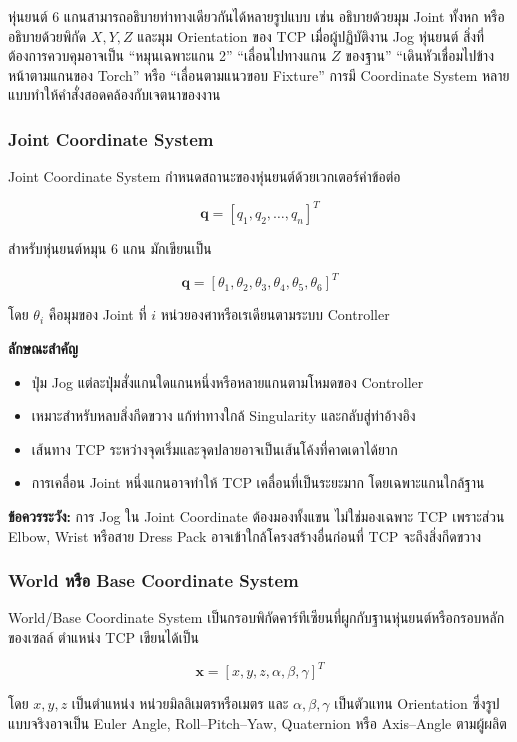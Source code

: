 หุ่นยนต์ 6 แกนสามารถอธิบายท่าทางเดียวกันได้หลายรูปแบบ เช่น อธิบายด้วยมุม Joint ทั้งหก หรืออธิบายด้วยพิกัด $X,Y,Z$ และมุม Orientation ของ TCP เมื่อผู้ปฏิบัติงาน Jog หุ่นยนต์ สิ่งที่ต้องการควบคุมอาจเป็น “หมุนเฉพาะแกน 2” “เลื่อนไปทางแกน $Z$ ของฐาน” “เดินหัวเชื่อมไปข้างหน้าตามแกนของ Torch” หรือ “เลื่อนตามแนวขอบ Fixture” การมี Coordinate System หลายแบบทำให้คำสั่งสอดคล้องกับเจตนาของงาน

\subsubsection{Joint Coordinate System}

Joint Coordinate System กำหนดสถานะของหุ่นยนต์ด้วยเวกเตอร์ค่าข้อต่อ

\[
\mathbf{q} = [q_1,q_2,\ldots,q_n]^T
\]

สำหรับหุ่นยนต์หมุน 6 แกน มักเขียนเป็น

\[
\mathbf{q} = [\theta_1,\theta_2,\theta_3,\theta_4,\theta_5,\theta_6]^T
\]

โดย $\theta_i$ คือมุมของ Joint ที่ $i$ หน่วยองศาหรือเรเดียนตามระบบ Controller

\textbf{ลักษณะสำคัญ}

\begin{itemize}
    \item ปุ่ม Jog แต่ละปุ่มสั่งแกนใดแกนหนึ่งหรือหลายแกนตามโหมดของ Controller
    \item เหมาะสำหรับหลบสิ่งกีดขวาง แก้ท่าทางใกล้ Singularity และกลับสู่ท่าอ้างอิง
    \item เส้นทาง TCP ระหว่างจุดเริ่มและจุดปลายอาจเป็นเส้นโค้งที่คาดเดาได้ยาก
    \item การเคลื่อน Joint หนึ่งแกนอาจทำให้ TCP เคลื่อนที่เป็นระยะมาก โดยเฉพาะแกนใกล้ฐาน
\end{itemize}

\textbf{ข้อควรระวัง:} การ Jog ใน Joint Coordinate ต้องมองทั้งแขน ไม่ใช่มองเฉพาะ TCP เพราะส่วน Elbow, Wrist หรือสาย Dress Pack อาจเข้าใกล้โครงสร้างอื่นก่อนที่ TCP จะถึงสิ่งกีดขวาง

\subsubsection{World หรือ Base Coordinate System}

World/Base Coordinate System เป็นกรอบพิกัดคาร์ทีเซียนที่ผูกกับฐานหุ่นยนต์หรือกรอบหลักของเซลล์ ตำแหน่ง TCP เขียนได้เป็น

\[
\mathbf{x} = [x,y,z,\alpha,\beta,\gamma]^T
\]

โดย $x,y,z$ เป็นตำแหน่ง หน่วยมิลลิเมตรหรือเมตร และ $\alpha,\beta,\gamma$ เป็นตัวแทน Orientation ซึ่งรูปแบบจริงอาจเป็น Euler Angle, Roll–Pitch–Yaw, Quaternion หรือ Axis–Angle ตามผู้ผลิต

